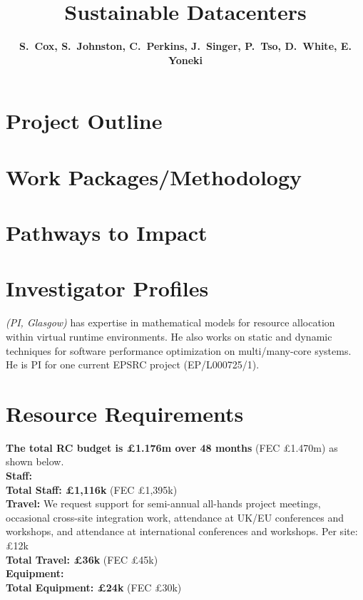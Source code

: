\documentclass[a4paper,11pt]{article}
\begin{document}
\title{\Large \bfseries Sustainable Datacenters \vspace{-4mm}}
\author{\vspace{-5mm} \textbf{\normalsize S.\ Cox, S.\ Johnston, C.\ Perkins, J.\ Singer,  P.\ Tso, D.\ White, E. Yoneki}}
\date{\vspace{-6mm}}
\maketitle
\vspace{-10mm}
%
%
\section{Project Outline}



\section{Work Packages/Methodology}


\section{Pathways to Impact}



\section{Investigator Profiles}

\textit{(PI, Glasgow)} has 
expertise in mathematical models for resource allocation
within virtual runtime environments. He also works on
static and dynamic techniques for
software performance optimization on multi/many-core systems.
He is PI for one current EPSRC project (EP/L000725/1).



\section{Resource Requirements}

\textbf{The total RC budget is \pounds 1.176m over 48 months} (FEC \pounds 1.470m) as shown below.
\\
\textbf{Staff:} 
\\
\textbf{Total Staff: \pounds 1,116k} (FEC \pounds 1,395k)\vspace{1mm}
\\
\textbf{Travel:}
We request support for semi-annual all-hands project meetings,
occasional cross-site integration work,
attendance at UK/EU conferences and
workshops,
and attendance at international
conferences and workshops.
Per site: \pounds 12k
\\
\textbf{Total Travel: \pounds 36k} (FEC \pounds 45k)\vspace{1mm}
\\
\textbf{Equipment:}
\\
\textbf{Total Equipment: \pounds 24k} (FEC \pounds 30k)
\\
\end{document}
